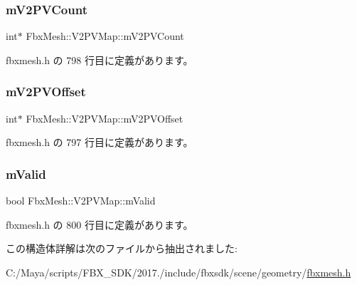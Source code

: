 \subsubsection{\texorpdfstring{m\+V2\+P\+V\+Count}{mV2PVCount}}
{\footnotesize\ttfamily int$\ast$ Fbx\+Mesh\+::\+V2\+P\+V\+Map\+::m\+V2\+P\+V\+Count}



 fbxmesh.\+h の 798 行目に定義があります。

\mbox{\label{struct_fbx_mesh_1_1_v2_p_v_map_a607eb9cd4d49d0aa8eb042d780a837a3}} 
\subsubsection{\texorpdfstring{m\+V2\+P\+V\+Offset}{mV2PVOffset}}
{\footnotesize\ttfamily int$\ast$ Fbx\+Mesh\+::\+V2\+P\+V\+Map\+::m\+V2\+P\+V\+Offset}



 fbxmesh.\+h の 797 行目に定義があります。

\mbox{\label{struct_fbx_mesh_1_1_v2_p_v_map_a23599f521bff9cdaf5da7c5ee403b0cc}} 
\subsubsection{\texorpdfstring{m\+Valid}{mValid}}
{\footnotesize\ttfamily bool Fbx\+Mesh\+::\+V2\+P\+V\+Map\+::m\+Valid}



 fbxmesh.\+h の 800 行目に定義があります。



この構造体詳解は次のファイルから抽出されました\+:\begin{DoxyCompactItemize}
\item 
C\+:/\+Maya/scripts/\+F\+B\+X\+\_\+\+S\+D\+K/2017./include/fbxsdk/scene/geometry/\hyperlink{fbxmesh_8h}{fbxmesh.\+h}\end{DoxyCompactItemize}

